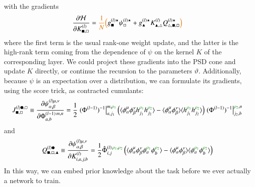 \documentclass[../main.tex]{subfiles}
\begin{document}
with the gradients
\begin{align*}
  \frac{\partial \mathcal H}{\partial K^{(l)}_{\blacksquare, \square}}
  =
  \fix{\frac1N \Big(}
  g^{(l)\star}_{\blacksquare} \psi^{(l)\star}_{\square} 
  + g^{(l)\star}_{\blacktriangle} K^{(l)}_{\blacktriangle, \triangle} Q^{(l)\star}_{\triangle, \blacksquare, \square}
  \fix{\Big)}
\end{align*}
where the first term is the usual rank-one weight update, and the latter is the high-rank term coming from the dependence of $\psi$ on the kernel $K$ of the corresponding layer. We could project these gradients into the PSD cone and update $K$ directly, or continue the recursion to the parameters $\vartheta$. Additionally, because $\psi$ is an expectation over a distribution, we can formulate its gradients, using the score trick, as contracted cumulants:
\begin{align*}
  J^{(l)\medbullet,\medcirc}_{\blacksquare, \square}
  \equiv
  \frac{\partial \psi^{(l)\mu,\nu}_{\alpha, \beta}}{\partial \Phi^{(l-1)\,m,n}_{a,b}}
  = \frac12 
    \left. (\Phi^{(l-1)})^{-1} \right|^{m, \typo{\rho_1}}_{a, j_1}
    \left(
      \langle 
        \phi^{\mu}_{\alpha} \phi^{\nu}_{\beta} h^{\typo{\rho_1}}_{j_1} h^{\typo{\rho_2}}_{j_2}
      \rangle
      -
      \langle
        \phi^{\mu}_{\alpha} \phi^{\nu}_{\beta}
      \rangle
      \langle
        h^{\typo{\rho_1}}_{j_1} h^{\typo{\rho_2}}_{j_2}
      \rangle
    \right) 
    \left. (\Phi^{(l-1)})^{-1} \right|^{\typo{\rho_2}, n}_{j_2, b}
\end{align*}
and
\begin{align*}
  Q^{(l)\medbullet}_{\blacksquare, \square, \blacktriangle}
  \equiv
  \frac{\partial \psi^{(l)\mu,\nu}_{\alpha, \beta}}{\partial K^{(l)}_{i,a,j,b}}
  = \frac12 
    \hat \Phi^{(l)\,\typo{\rho_1,\rho_2}}_{i,j}
    \left(
      \langle 
        \phi^{\mu}_{\alpha} \phi^{\nu}_{\beta} \phi^{\typo{\rho_1}}_{a} \phi^{\typo{\rho_2}}_{b}
      \rangle
      -
      \langle
        \phi^{\mu}_{\alpha} \phi^{\nu}_{\beta}
      \rangle
      \langle
        \phi^{\typo{\rho_1}}_{a} \phi^{\typo{\rho_2}}_{b}
      \rangle
    \right) 
\end{align*}
In this way, we can embed prior knowledge about the task before we ever actually  a network to train.
\end{document}
